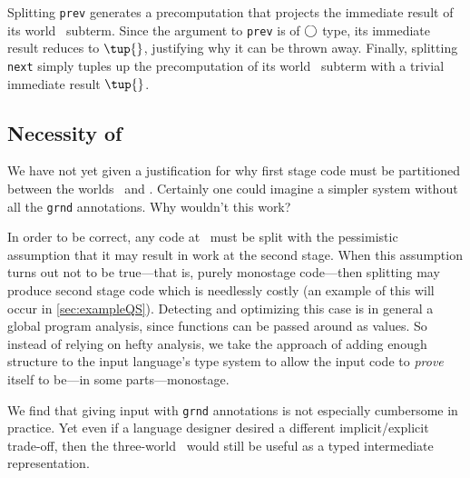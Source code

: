 \begin{abstrsyn}
Splitting \texttt{prev} generates a precomputation that projects the immediate
result of its world \bbone\ subterm.
Since the argument to \texttt{prev} is of $\bigcirc$ type, its immediate result reduces to $\tup{}$, justifying why it can be thrown away.
Finally, splitting \texttt{next} simply tuples up the precomputation of its
world \bbtwo\ subterm with a trivial immediate result $\tup{}$.

\subsection {Necessity of \bbonep}
\label{sec:needGround}

We have not yet given a justification for why first stage code must be
partitioned between the worlds \bbonem\ and \bbonep.
Certainly one could imagine a simpler system without all the \texttt{grnd} annotations.  
Why wouldn't this work?

In order to be correct, any code at \bbonem\ must be split with the 
pessimistic assumption that it may result in work at the second stage.
When this assumption turns out not to be true---that is, purely monostage code---then 
splitting may produce second stage code which is needlessly costly 
(an example of this will occur in \ref{sec:exampleQS}).
Detecting and optimizing this case is in general a global program analysis,
since functions can be passed around as values.  
So instead of relying on hefty analysis, 
we take the approach of adding enough structure to the input language's type system to
allow the input code to {\em prove} itself to be---in some parts---monostage.

We find that giving input with \texttt{grnd} annotations is not especially cumbersome in practice.
Yet even if a language designer desired a different implicit/explicit trade-off,
then the three-world \lang\ would still be useful as a typed intermediate representation.

\end{abstrsyn}



